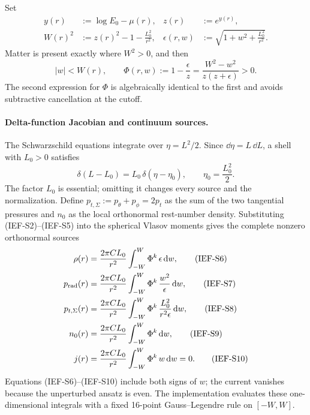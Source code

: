 Set
\begin{align}
 y(r)&:=\log E_0-\mu(r),& z(r)&:=e^{y(r)},              \tag{IEF-S3a}\\
 W(r)^2&:=z(r)^2-1-\frac{L_0^2}{r^2},&
 \epsilon(r,w)&:=\sqrt{1+w^2+\frac{L_0^2}{r^2}}.   \tag{IEF-S3b}
\end{align}
Matter is present exactly where \(W^2>0\), and then
\[
 |w|<W(r),\qquad
 \Phi(r,w):=1-\frac{\epsilon}{z}
 =\frac{W^2-w^2}{z(z+\epsilon)}>0.                    \tag{IEF-S4}
\]
The second expression for \(\Phi\) is algebraically identical to the first
and avoids subtractive cancellation at the cutoff.

\paragraph{Delta-function Jacobian and continuum sources.}
The Schwarzschild equations integrate over \(\eta=L^2/2\).
Since \(\dd\eta=L\,\dd L\), a shell with \(L_0>0\) satisfies
\[
 \delta(L-L_0)
 =L_0\,\delta(\eta-\eta_0),\qquad \eta_0=\frac{L_0^2}{2}.                  \tag{IEF-S5}
\]
The factor \(L_0\) is essential; omitting it changes every source and the
normalization.  Define
\(p_{t,\Sigma}:=p_\theta+p_\phi=2p_t\) as the sum of the two tangential
pressures and \(n_0\) as the local orthonormal rest-number density.
Substituting (IEF-S2)--(IEF-S5) into the spherical Vlasov moments gives the
complete nonzero orthonormal sources
\begin{align}
 \rho(r)&=\frac{2\pi CL_0}{r^2}
    \int_{-W}^{W}\Phi^k\,\epsilon\,\mathrm d w,                \tag{IEF-S6}\\
 p_{\rm rad}(r)&=\frac{2\pi CL_0}{r^2}
    \int_{-W}^{W}\Phi^k\,\frac{w^2}{\epsilon}\,\mathrm d w,   \tag{IEF-S7}\\
 p_{t,\Sigma}(r)&=\frac{2\pi CL_0}{r^2}
    \int_{-W}^{W}\Phi^k\,
       \frac{L_0^2}{r^2\epsilon}\,\mathrm d w,            \tag{IEF-S8}\\
 n_0(r)&=\frac{2\pi CL_0}{r^2}
    \int_{-W}^{W}\Phi^k\,\mathrm d w,                          \tag{IEF-S9}\\
 j(r)&=\frac{2\pi CL_0}{r^2}
    \int_{-W}^{W}\Phi^k\,w\,\mathrm d w=0.                    \tag{IEF-S10}
\end{align}
Equations (IEF-S6)--(IEF-S10) include both
signs of \(w\); the current vanishes because the unperturbed ansatz is even.
The implementation evaluates these one-dimensional integrals with a fixed
16-point Gauss--Legendre rule on \([-W,W]\).

